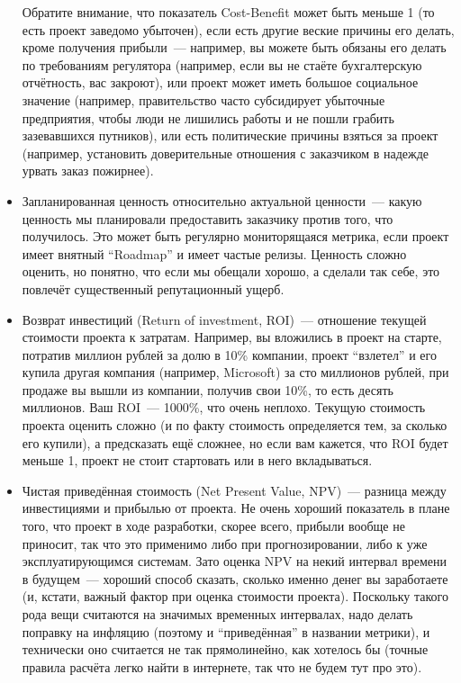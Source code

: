 \documentclass{../../text-style}
\begin{document}
\begin{itemize}
    Обратите внимание, что показатель Cost-Benefit может быть меньше 1 (то есть проект заведомо убыточен), если есть другие веские причины его делать, кроме получения прибыли~--- например, вы можете быть обязаны его делать по требованиям регулятора (например, если вы не стаёте бухгалтерскую отчётность, вас закроют), или проект может иметь большое социальное значение (например, правительство часто субсидирует убыточные предприятия, чтобы люди не лишились работы и не пошли грабить зазевавшихся путников), или есть политические причины взяться за проект (например, установить доверительные отношения с заказчиком в надежде урвать заказ пожирнее).
    \item Запланированная ценность относительно актуальной ценности~--- какую ценность мы планировали предоставить заказчику против того, что получилось. Это может быть регулярно мониторящаяся метрика, если проект имеет внятный \enquote{Roadmap} и имеет частые релизы. Ценность сложно оценить, но понятно, что если мы обещали хорошо, а сделали так себе, это повлечёт существенный репутационный ущерб.
    \item Возврат инвестиций (Return of investment, ROI)~--- отношение текущей стоимости проекта к затратам. Например, вы вложились в проект на старте, потратив миллион рублей за долю в 10\% компании, проект \enquote{взлетел} и его купила другая компания (например, Microsoft) за сто миллионов рублей, при продаже вы вышли из компании, получив свои 10\%, то есть десять миллионов. Ваш ROI~--- 1000\%, что очень неплохо. Текущую стоимость проекта оценить сложно (и по факту стоимость определяется тем, за сколько его купили), а предсказать ещё сложнее, но если вам кажется, что ROI будет меньше 1, проект не стоит стартовать или в него вкладываться.
    \item Чистая приведённая стоимость (Net Present Value, NPV)~--- разница между инвестициями и прибылью от проекта. Не очень хороший показатель в плане того, что проект в ходе разработки, скорее всего, прибыли вообще не приносит, так что это применимо либо при прогнозировании, либо к уже эксплуатирующимся системам. Зато оценка NPV на некий интервал времени в будущем~--- хороший способ сказать, сколько именно денег вы заработаете (и, кстати, важный фактор при оценка стоимости проекта). Поскольку такого рода вещи считаются на значимых временных интервалах, надо делать поправку на инфляцию (поэтому и \enquote{приведённая} в названии метрики), и технически оно считается не так прямолинейно, как хотелось бы (точные правила расчёта легко найти в интернете, так что не будем тут про это).
\end{itemize}
\end{document}

